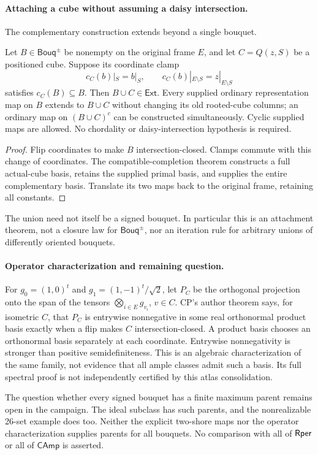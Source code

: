 \paragraph{Attaching a cube without assuming a daisy intersection.}
The complementary construction extends beyond a single bouquet.
\begin{proposition}
\label{prop:atlas-bouquet-cube-attachment}
Let $B\in\mathsf{Bouq}^{\pm}$ be nonempty on the original frame $E$, and
let $C=Q(z,S)$ be a positioned cube. Suppose its coordinate clamp
\[
 c_C(b)|_S=b|_S,\qquad c_C(b)|_{E\setminus S}=z|_{E\setminus S}
\]
satisfies $c_C(B)\subseteq B$. Then $B\cup C\in\mathsf{Ext}$.
Every supplied ordinary representation map on $B$ extends to $B\cup C$
without changing its old rooted-cube columns; an ordinary map on
$(B\cup C)^c$ can be constructed simultaneously. Cyclic supplied maps
are allowed. No chordality or daisy-intersection hypothesis is required.
\end{proposition}
\begin{proof}
Flip coordinates to make $B$ intersection-closed. Clamps commute with
this change of coordinates. The compatible-completion theorem
\cite[\texttt{thm:horn-gluing}]{CubeComplementCompletion} constructs a full
actual-cube basis, retains the supplied primal basis, and supplies the
entire complementary basis. Translate its two maps back to the original
frame, retaining all constants.
\end{proof}
The union need not itself be a signed bouquet. In particular this is an
attachment theorem, not a closure law for $\mathsf{Bouq}^{\pm}$, nor an
iteration rule for arbitrary unions of differently oriented bouquets.

\paragraph{Operator characterization and remaining question.}
For $g_0=(1,0)^t$ and $g_1=(1,-1)^t/\sqrt2$, let $P_C$ be the orthogonal
projection onto the span of the tensors $\bigotimes_{i\in E}g_{v_i}$,
$v\in C$. CP's author theorem
\cite[\texttt{thm:classification}]{BouquetProjection} says, for isometric
$C$, that $P_C$ is entrywise nonnegative in some real orthonormal product
basis exactly when a flip makes $C$ intersection-closed. A product basis
chooses an orthonormal basis separately at each coordinate. Entrywise
nonnegativity is stronger than positive semidefiniteness. This is an
algebraic characterization of the same family, not evidence that all ample
classes admit such a basis. Its full spectral proof is not independently
certified by this atlas consolidation.

The question whether every signed bouquet has a finite maximum parent
remains open in the campaign. The ideal subclass has such parents, and the
nonrealizable 26-set example does too. Neither the explicit two-shore maps
nor the operator characterization supplies parents for all bouquets.
No comparison with all of $\mathsf{Rper}$ or all of $\mathsf{CAmp}$ is asserted.
